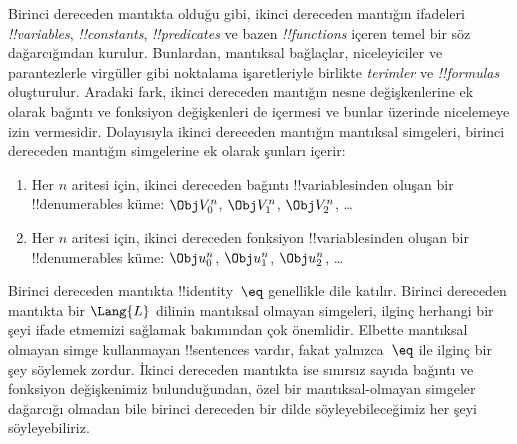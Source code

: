 \documentclass[../../../include/open-logic-section]{subfiles}
\begin{document}


Birinci dereceden mantıkta olduğu gibi, ikinci dereceden mantığın ifadeleri
\emph{!!{variable}s}, \emph{!!{constant}s}, \emph{!!{predicate}s} ve bazen
\emph{!!{function}s} içeren temel bir söz dağarcığından kurulur. Bunlardan,
mantıksal bağlaçlar, niceleyiciler ve parantezlerle virgüller gibi noktalama
işaretleriyle birlikte \emph{terimler} ve \emph{!!{formula}s} oluşturulur.
Aradaki fark, ikinci dereceden mantığın nesne değişkenlerine ek olarak bağıntı
ve fonksiyon değişkenleri de içermesi ve bunlar üzerinde nicelemeye izin
vermesidir. Dolayısıyla ikinci dereceden mantığın mantıksal simgeleri, birinci
dereceden mantığın simgelerine ek olarak şunları içerir:

\begin{enumerate}
\item Her $n$ aritesi için, ikinci dereceden bağıntı !!{variable}s{}inden oluşan bir
  !!{denumerable}s küme: $\Obj V_0^n$, $\Obj V_1^n$, $\Obj V_2^n$, \dots
\item Her $n$ aritesi için, ikinci dereceden fonksiyon !!{variable}s{}inden oluşan bir
  !!{denumerable}s küme: $\Obj u_0^n$, $\Obj u_1^n$, $\Obj u_2^n$, \dots
\end{enumerate}

Birinci dereceden mantıkta !!{identity}~$\eq$ genellikle dile katılır.
Birinci dereceden mantıkta bir $\Lang{L}$ dilinin mantıksal olmayan simgeleri,
ilginç herhangi bir şeyi ifade etmemizi sağlamak bakımından çok önemlidir.
Elbette mantıksal olmayan simge kullanmayan !!{sentence}s vardır, fakat
yalnızca~$\eq$ ile ilginç bir şey söylemek zordur. İkinci dereceden mantıkta
ise sınırsız sayıda bağıntı ve fonksiyon değişkenimiz bulunduğundan, özel bir
mantıksal-olmayan simgeler dağarcığı olmadan bile birinci dereceden bir dilde
söyleyebileceğimiz her şeyi söyleyebiliriz.
\end{document}
